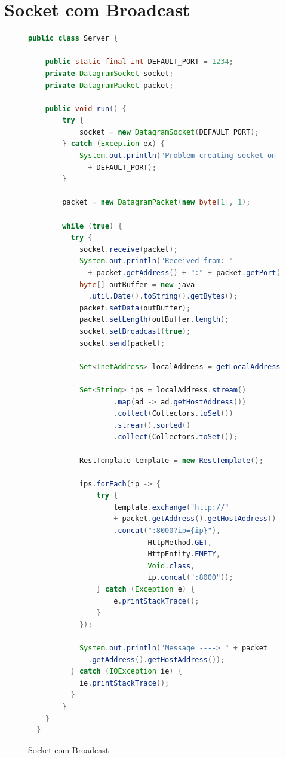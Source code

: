 \documentclass[journal]{IEEEtran}
\begin{document}
\clearpage

\section{Socket com Broadcast}

\begin{figure}[H]
\centering

\begin{lstlisting}[language=Java]
  public class Server {

    public static final int DEFAULT_PORT = 1234;
    private DatagramSocket socket;
    private DatagramPacket packet;

    public void run() {
        try {
            socket = new DatagramSocket(DEFAULT_PORT);
        } catch (Exception ex) {
            System.out.println("Problem creating socket on port: " 
              + DEFAULT_PORT);
        }

        packet = new DatagramPacket(new byte[1], 1);

        while (true) {
          try {
            socket.receive(packet);
            System.out.println("Received from: " 
              + packet.getAddress() + ":" + packet.getPort());
            byte[] outBuffer = new java
              .util.Date().toString().getBytes();
            packet.setData(outBuffer);
            packet.setLength(outBuffer.length);
            socket.setBroadcast(true);
            socket.send(packet);

            Set<InetAddress> localAddress = getLocalAddress();

            Set<String> ips = localAddress.stream()
                    .map(ad -> ad.getHostAddress())
                    .collect(Collectors.toSet())
                    .stream().sorted()
                    .collect(Collectors.toSet());

            RestTemplate template = new RestTemplate();

            ips.forEach(ip -> {
                try {
                    template.exchange("http://" 
                    + packet.getAddress().getHostAddress()
                    .concat(":8000?ip={ip}"),
                            HttpMethod.GET,
                            HttpEntity.EMPTY,
                            Void.class,
                            ip.concat(":8000"));
                } catch (Exception e) {
                    e.printStackTrace();
                }
            });

            System.out.println("Message ----> " + packet
              .getAddress().getHostAddress());
          } catch (IOException ie) {
            ie.printStackTrace();
          }
        }
    }
  }
\end{lstlisting}
\caption{Socket com Broadcast}
\label{broadcastcodejava}
\end{figure}
\end{document}
